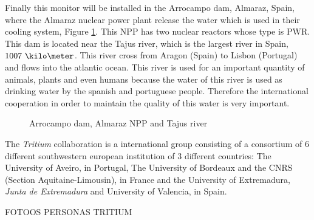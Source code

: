 Finally this monitor will be installed in the Arrocampo dam, Almaraz, Spain, where the Almaraz nuclear power plant release the water which is used in their cooling system, Figure \ref{fig:Arrocampo}. This NPP has two nuclear reactors whose type is PWR. This dam is located near the Tajus river, which is the largest river in Spain, $1007~\kilo\meter$. This river cross from Aragon (Spain) to Lisbon (Portugal) and flows into the atlantic ocean. This river is used for an important quantity of animals, plants and even humans because the water of this river is used as drinking water by the spanish and portuguese people. Therefore the international cooperation in order to maintain the quality of this water is very important.

\begin{figure}[]
 \centering
 \caption{Arrocampo dam, Almaraz NPP and Tajus river}
 \label{fig:Arrocampo}
\end{figure}

The \textit{Tritium} collaboration is a international group consisting of a consortium of 6 different southwestern european institution of 3 different countries: The University of Aveiro, in Portugal, The University of Bordeaux and the CNRS  (Section Aquitaine-Limousin), in France and the University of Extremadura, \textit{Junta de Extremadura} and University of Valencia, in Spain.

FOTOOS PERSONAS TRITIUM

